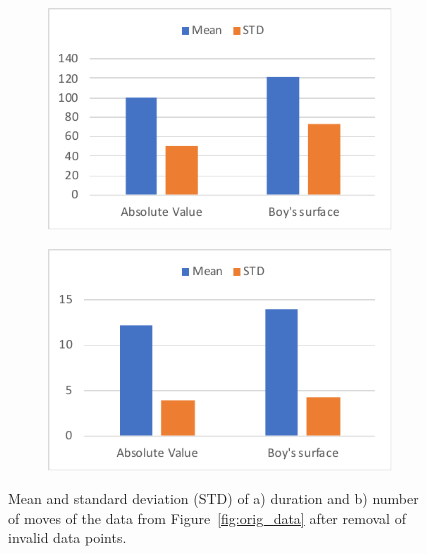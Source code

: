 \documentclass[hyperref, plainreport, noproblem]{cgvpub1}
\begin{document}
\begin{figure}[ht]
    \centering
    \begin{subfigure}[b]{0.45\textwidth}
    	\includegraphics[width = \columnwidth]{time_avg}
	 \caption{ }
    \end{subfigure}
    \begin{subfigure}[b]{0.45\textwidth}
    	\includegraphics[width = \columnwidth]{move_avg}
	 \caption{}
    \end{subfigure}
    \caption{Mean and standard deviation (STD) of a) duration and b) number of moves of the data from Figure~\ref{fig:orig_data} after removal of invalid data points.}
    \label{fig:avg_data}
\end{figure}



\end{document}
